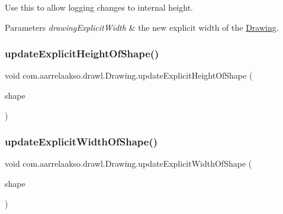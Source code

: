 Use this to allow logging changes to internal height.


\begin{DoxyParams}{Parameters}
{\em drawing\+Explicit\+Width} & the new explicit width of the \hyperlink{classcom_1_1aarrelaakso_1_1drawl_1_1_drawing}{Drawing}. \\
\hline
\end{DoxyParams}
\mbox{\label{classcom_1_1aarrelaakso_1_1drawl_1_1_drawing_ab55b53c2e069f28185865f5cf677c8cd}} 
\subsubsection{\texorpdfstring{update\+Explicit\+Height\+Of\+Shape()}{updateExplicitHeightOfShape()}}
{\footnotesize\ttfamily void com.\+aarrelaakso.\+drawl.\+Drawing.\+update\+Explicit\+Height\+Of\+Shape (\begin{DoxyParamCaption}\item[{@Not\+Null final \hyperlink{classcom_1_1aarrelaakso_1_1drawl_1_1_shape}{Shape}}]{shape }\end{DoxyParamCaption})\hspace{0.3cm}{\ttfamily [private]}}

\mbox{\label{classcom_1_1aarrelaakso_1_1drawl_1_1_drawing_a5c146de66e8f3272b57322f1cee7d7d6}} 
\subsubsection{\texorpdfstring{update\+Explicit\+Width\+Of\+Shape()}{updateExplicitWidthOfShape()}}
{\footnotesize\ttfamily void com.\+aarrelaakso.\+drawl.\+Drawing.\+update\+Explicit\+Width\+Of\+Shape (\begin{DoxyParamCaption}\item[{@Not\+Null final \hyperlink{classcom_1_1aarrelaakso_1_1drawl_1_1_shape}{Shape}}]{shape }\end{DoxyParamCaption})\hspace{0.3cm}{\ttfamily [private]}}

